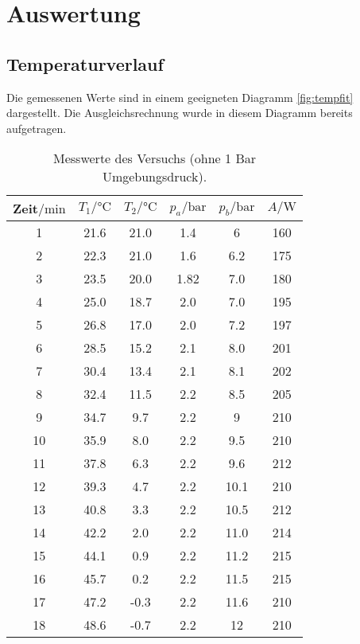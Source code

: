 \section{Auswertung}
\label{sec:Auswertung}
\subsection{Temperaturverlauf}
Die gemessenen Werte sind in einem geeigneten Diagramm \ref{fig:tempfit} dargestellt.
Die Ausgleichsrechnung wurde in diesem Diagramm bereits aufgetragen.
\begin{table}[H]
    \centering
    \caption{Messwerte des Versuchs (ohne 1 Bar Umgebungsdruck).}
    \label{tab:t1}
    \begin{tabular}{S[table-format=2.0] S S S S S[table-format=3.0]}
        \toprule
        {Zeit$/\si{\minute}$} & {$T_1/\si{\celsius}$} & {$T_2/\si{\celsius}$} & {$p_a/\si{\bar}$} & {$p_b/\si{\bar}$} & {$A/\si{\watt}$}\\
           & 21.6  & 21.0  & 1.4   & 6     & 160   \\
        2   & 22.3  & 21.0  & 1.6   & 6.2   & 175   \\
        3   & 23.5  & 20.0  & 1.82  & 7.0   & 180   \\
        4   & 25.0  & 18.7  & 2.0   & 7.0   & 195   \\
        5   & 26.8  & 17.0  & 2.0   & 7.2   & 197   \\
        6   & 28.5  & 15.2  & 2.1   & 8.0   & 201   \\
        7   & 30.4  & 13.4  & 2.1   & 8.1   & 202   \\
        8   & 32.4  & 11.5  & 2.2   & 8.5   & 205   \\
        9   & 34.7  & 9.7   & 2.2   & 9     & 210   \\
        10  & 35.9  & 8.0   & 2.2   & 9.5   & 210   \\
        11  & 37.8  & 6.3   & 2.2   & 9.6   & 212   \\
        12  & 39.3  & 4.7   & 2.2   & 10.1  & 210   \\
        13  & 40.8  & 3.3   & 2.2   & 10.5  & 212   \\
        14  & 42.2  & 2.0   & 2.2   & 11.0  & 214   \\
        15  & 44.1  & 0.9   & 2.2   & 11.2  & 215   \\
        16  & 45.7  & 0.2   & 2.2   & 11.5  & 215   \\
        17  & 47.2  & -0.3  & 2.2   & 11.6  & 210   \\
        18  & 48.6  & -0.7  & 2.2   & 12    & 210   \\
        \bottomrule
    \end{tabular}
\end{table}

